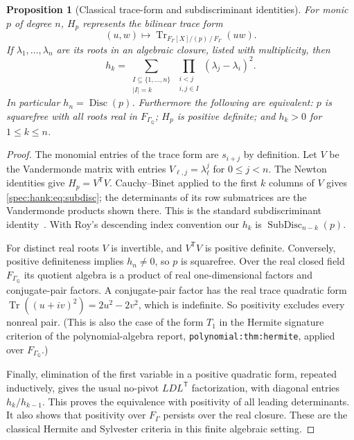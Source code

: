\documentclass[11pt,a4paper]{article}
\numberwithin{equation}{section}
\newtheorem{proposition}[proposition]{Proposition}
\theoremstyle{definition}
\theoremstyle{remark}
\newcommand{\Q}{\mathbb Q}
\newcommand{\Tr}{\operatorname{Tr}}
\newcommand{\Disc}{\operatorname{Disc}}
\begin{document}
\begin{proposition}[Classical trace-form and subdiscriminant identities]
\label{spec:hank:prop:hermite}
For monic $p$ of degree $n$, $H_p$ represents the bilinear trace form
\[
 (u,w)\longmapsto\Tr_{F_\Gamma[X]/(p)\,/\,F_\Gamma}(uw).
\]
If $\lambda_1,\ldots,\lambda_n$ are its roots in an algebraic closure,
listed with multiplicity, then
\begin{equation}\label{spec:hank:eq:subdisc}
 h_k=\sum_{\substack{I\subseteq\{1,\ldots,n\}\\ |I|=k}}
       \prod_{\substack{i<j\\i,j\in I}}(\lambda_j-\lambda_i)^2.
\end{equation}
In particular $h_n=\Disc(p)$. Furthermore the following are equivalent:
$p$ is squarefree with all roots real in $F_{\Gamma_\Q}$; $H_p$ is positive
definite; and $h_k>0$ for $1\le k\le n$.
\end{proposition}
\begin{proof}
The monomial entries of the trace form are $s_{i+j}$ by definition. Let $V$
be the Vandermonde matrix with entries $V_{\ell,j}=\lambda_\ell^j$ for
$0\le j<n$. The Newton identities give $H_p=V^{\mathsf T}V$. Cauchy--Binet
applied to the first $k$ columns of $V$ gives \eqref{spec:hank:eq:subdisc};
the determinants of its row submatrices are the Vandermonde products shown
there. This is the standard subdiscriminant identity~\cite{Roy}. With Roy's
descending index convention our $h_k$ is $\operatorname{SubDisc}_{n-k}(p)$.

For distinct real roots $V$ is invertible, and $V^{\mathsf T}V$ is positive
definite. Conversely, positive definiteness implies $h_n\ne0$, so $p$ is
squarefree. Over the real closed field $F_{\Gamma_\Q}$ its quotient algebra
is a product of real one-dimensional factors and conjugate-pair factors. A
conjugate-pair factor has the real trace quadratic form
$\Tr((u+iv)^2)=2u^2-2v^2$, which is indefinite. So positivity excludes every
nonreal pair. (This is also the case of the form $T_1$ in the Hermite
signature criterion of the polynomial-algebra report,
\texttt{polynomial:thm:hermite}, applied over $F_{\Gamma_\Q}$.)

Finally, elimination of the first variable in a positive quadratic form,
repeated inductively, gives the usual no-pivot $LDL^{\mathsf T}$
factorization, with diagonal entries $h_k/h_{k-1}$. This proves the
equivalence with positivity of all leading determinants. It also shows that
positivity over $F_\Gamma$ persists over the real closure. These are the
classical Hermite and Sylvester criteria in this finite algebraic setting.
\end{proof}
\end{document}
